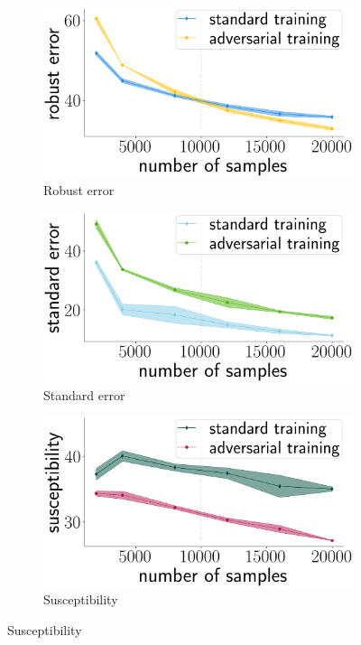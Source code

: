 \begin{figure}[!b]
\centering
\begin{subfigure}[b]{0.32\textwidth}
  \includegraphics[width=0.99\linewidth]{plotsAistats/cifar10_robust_numobs.png}
  \caption{Robust error}
  \label{fig:RA_CIFAR_10_n}
\end{subfigure}
\begin{subfigure}[b]{0.32\textwidth}
  \includegraphics[width=0.99\linewidth]{plotsAistats/cifar10_standard_numobs.png}
  \caption{Standard error}
  \label{fig:SA_CIFAR_10_n}
\end{subfigure}
\begin{subfigure}[b]{0.32\textwidth}
  \includegraphics[width=0.99\linewidth]{plotsAistats/cifar10_sus_numobs.png}
  \caption{Susceptibility}
  \label{fig:Robustness_n}
\end{subfigure}


\end{figure}
